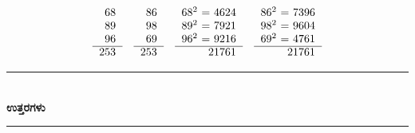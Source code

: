 \begin{enumerate}
\begin{equation*}
\begin{tabular}[t]{r}
68 \\
89\\
96\\\cline{1-1} 
253
\end{tabular}
\quad
\begin{tabular}[t]{r}
86\\ 
98\\
69\\\cline{1-1} 
253
\end{tabular}
\quad
\begin{tabular}[t]{r}
68$^{2}$ = 4624 \\
89$^{2}$ = 7921\\
96$^{2}$ = 9216\\\cline{1-1} 
\qquad 21761
\end{tabular}
\quad
\begin{tabular}[t]{r}
86$^{2}$ = 7396\\ 
98$^{2}$ = 9604\\
69$^{2}$ = 4761\\\cline{1-1} 
\qquad 21761
\end{tabular}
\end{equation*}
\end{enumerate}

\begin{center}
\rule{5cm}{1pt}\\[3pt]
{\Large\bfseries ಉತ್ತರಗಳು}\\[-0.1cm]
\rule{5cm}{1pt}
\end{center}


